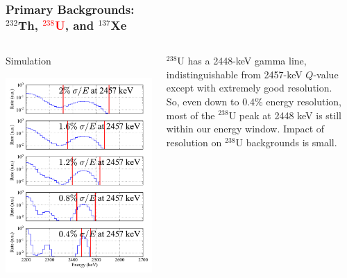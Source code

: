 \documentclass{beamer}
\begin{document}
\begin{frame}
\begin{center}
\frametitle{\hfill Primary Backgrounds:\\\hfill $^{232}$Th, \textcolor{red}{$^{238}$U}, and $^{137}$Xe}
\end{center}
\begin{columns}[T]
\begin{column}{.59\textwidth}
\vspace{-1cm}%
\begin{center}
Simulation
\end{center}
\vspace{-0.3cm}%
\includegraphics[keepaspectratio=true,width=\textwidth]{U_Spectra_vs_Res.pdf}
\end{column}
\begin{column}{.41\textwidth}
\vspace{0.5cm}

$^{238}$U has a 2448-keV gamma line, indistinguishable from 2457-keV $Q$-value except with extremely good resolution.\\[\baselineskip]

So, even down to 0.4\% energy resolution, most of the $^{238}$U peak at 2448 keV is still within our energy window.  Impact of resolution on $^{238}$U backgrounds is small.

\end{column}
\end{columns}
\end{frame}
\end{document}

